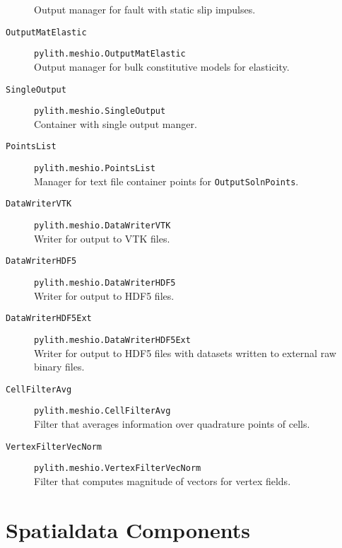 \begin{description}
Output manager for fault with static slip impulses.
\item [{\texttt{OutputMatElastic}}] \texttt{pylith.meshio.OutputMatElastic}\\
Output manager for bulk constitutive models for elasticity.
\item [{\texttt{SingleOutput}}] \texttt{pylith.meshio.SingleOutput}\\
Container with single output manger.
\item [{\texttt{PointsList}}] \texttt{pylith.meshio.PointsList}\\
Manager for text file container points for \texttt{OutputSolnPoints}.
\item [{\texttt{DataWriterVTK}}] \texttt{pylith.meshio.DataWriterVTK}\\
Writer for output to VTK files.
\item [{\texttt{DataWriterHDF5}}] \texttt{pylith.meshio.DataWriterHDF5}\\
Writer for output to HDF5 files.
\item [{\texttt{DataWriterHDF5Ext}}] \texttt{pylith.meshio.DataWriterHDF5Ext}\\
Writer for output to HDF5 files with datasets written to external
raw binary files.
\item [{\texttt{CellFilterAvg}}] \texttt{pylith.meshio.CellFilterAvg}\\
Filter that averages information over quadrature points of cells.
\item [{\texttt{VertexFilterVecNorm}}] \texttt{pylith.meshio.VertexFilterVecNorm}\\
Filter that computes magnitude of vectors for vertex fields.
\end{description}

\section{Spatialdata Components}


